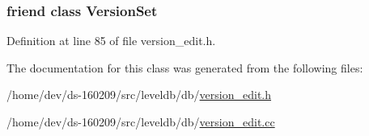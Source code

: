 \subsubsection[{Version\+Set}]{\setlength{\rightskip}{0pt plus 5cm}friend class {\bf Version\+Set}\hspace{0.3cm}{\ttfamily [friend]}}\label{classleveldb_1_1_version_edit_a1827cd1b4d6e9e3c378ce37ca3cce635}


Definition at line 85 of file version\+\_\+edit.\+h.



The documentation for this class was generated from the following files\+:\begin{DoxyCompactItemize}
\item 
/home/dev/ds-\/160209/src/leveldb/db/\hyperlink{version__edit_8h}{version\+\_\+edit.\+h}\item 
/home/dev/ds-\/160209/src/leveldb/db/\hyperlink{version__edit_8cc}{version\+\_\+edit.\+cc}\end{DoxyCompactItemize}
